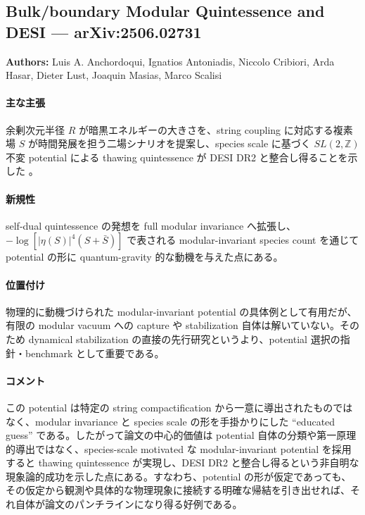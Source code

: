 \subsection{Bulk/boundary Modular Quintessence and DESI --- arXiv:2506.02731}

\textbf{Authors:} Luis A. Anchordoqui, Ignatios Antoniadis, Niccolo Cribiori, Arda Hasar, Dieter Lust, Joaquin Masias, Marco Scalisi

\paragraph{主な主張}
余剰次元半径 $R$ が暗黒エネルギーの大きさを、string coupling に対応する複素場 $S$ が時間発展を担う二場シナリオを提案し、species scale に基づく $SL(2,\mathbb{Z})$ 不変 potential による thawing quintessence が DESI DR2 と整合し得ることを示した \cite{Anchordoqui:2025modular}。

\paragraph{新規性}
self-dual quintessence の発想を full modular invariance へ拡張し、$-\log[|\eta(S)|^4(S+\bar S)]$ で表される modular-invariant species count を通じて potential の形に quantum-gravity 的な動機を与えた点にある。

\paragraph{位置付け}
物理的に動機づけられた modular-invariant potential の具体例として有用だが、有限の modular vacuum への capture や stabilization 自体は解いていない。そのため dynamical stabilization の直接の先行研究というより、potential 選択の指針・benchmark として重要である。

\paragraph{コメント}
この potential は特定の string compactification から一意に導出されたものではなく、modular invariance と species scale の形を手掛かりにした ``educated guess'' である。したがって論文の中心的価値は potential 自体の分類や第一原理的導出ではなく、species-scale motivated な modular-invariant potential を採用すると thawing quintessence が実現し、DESI DR2 と整合し得るという非自明な現象論的成功を示した点にある。すなわち、potential の形が仮定であっても、その仮定から観測や具体的な物理現象に接続する明確な帰結を引き出せれば、それ自体が論文のパンチラインになり得る好例である。
